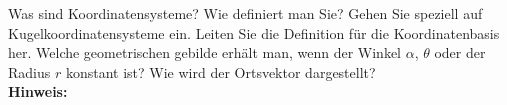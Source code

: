 \begin{question}[section=1,subsection=12,name={Koordinatensysteme},difficulty=,type=mdl,tags={}]
	Was sind Koordinatensysteme? Wie definiert man Sie? Gehen Sie speziell auf Kugelkoordinatensysteme ein. Leiten Sie die Definition für die Koordinatenbasis her. Welche geometrischen gebilde erhält man, wenn der Winkel $\alpha$, $\theta$ oder der Radius $r$ konstant ist? Wie wird der Ortsvektor dargestellt? 
	\\ \textbf{Hinweis:}\\
	
\end{question}
\begin{solution}
	
\end{solution}